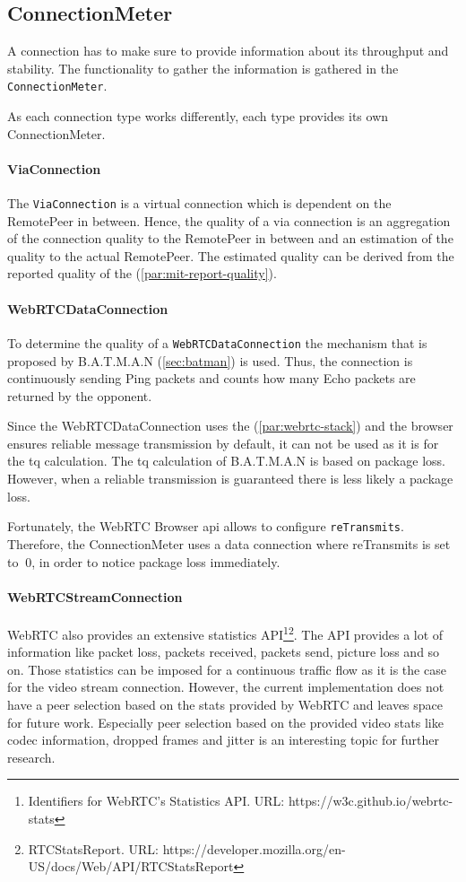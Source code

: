 \subsection{ConnectionMeter}\label{sec:mit-connectionMeter}
A connection has to make sure to provide information about its throughput and stability. The functionality to gather the information is gathered in the \lstinline|ConnectionMeter|.

As each connection type works differently, each type provides its own ConnectionMeter.

\paragraph{ViaConnection}
The \lstinline|ViaConnection| is a virtual connection which is dependent on the RemotePeer in between. Hence, the quality of a via connection is an aggregation of the connection quality to the RemotePeer in between and an estimation of the quality to the actual RemotePeer. The estimated quality can be derived from the reported quality of the \peerUpdate (\vref{par:mit-report-quality}).

\paragraph{WebRTCDataConnection} \label{par:webrtc-data-measure-quality}
To determine the quality of a \lstinline|WebRTCDataConnection| the  mechanism that is proposed by B.A.T.M.A.N (\vref{sec:batman}) is used. Thus, the connection is continuously sending Ping packets and counts how many Echo packets are returned by the opponent. 

Since the WebRTCDataConnection uses the  (\vref{par:webrtc-stack}) and the browser ensures reliable message transmission by default, it can not be used as it is for the \gls{tq} calculation. The \gls{tq} calculation of B.A.T.M.A.N is based on package loss. However, when a reliable transmission is guaranteed there is less likely a package loss.

Fortunately, the WebRTC Browser \gls{api} allows to configure \lstinline|reTransmits|. Therefore, the ConnectionMeter uses a data connection where reTransmits is set to $\ 0 $, in order to notice package loss immediately.

\paragraph{WebRTCStreamConnection}
WebRTC also provides an extensive statistics API\footnote{Identifiers for WebRTC's Statistics API. URL: {https://w3c.github.io/webrtc-stats}}\footnote{RTCStatsReport. URL: {https://developer.mozilla.org/en-US/docs/Web/API/RTCStatsReport}}. The API provides a lot of information like packet loss, packets received, packets send, picture loss and so on. Those statistics can be imposed for a continuous traffic flow as it is the case for the video stream connection. However, the current implementation does not have a peer selection based on the stats provided by WebRTC and leaves space for future work. Especially peer selection based on the provided video stats like codec information, dropped frames and jitter is an interesting topic for further research.

